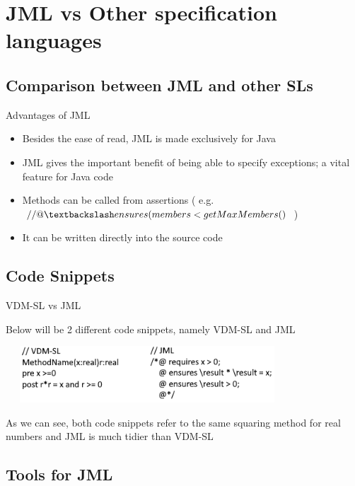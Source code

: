 \documentclass{beamer}
\begin{document}
\section{JML vs Other specification languages}

\subsection{Comparison between JML and other SLs}

\begin{frame}{Advantages of JML}
    \begin{itemize}
        \item Besides the ease of read, JML is made exclusively for Java
        \item JML gives the important benefit of being able to specify exceptions; a vital feature for Java code
        \item Methods can be called from assertions ( e.g. $//@ \textbackslash ensures (members < getMaxMembers()$ ) 
        \item It can be written directly into the source code
        
    \end{itemize}
\end{frame}

\subsection{Code Snippets}

\begin{frame}{VDM-SL vs JML}

Below will be 2 different code snippets, namely VDM-SL and JML
\bigskip

    \includegraphics[height=60pt,width=300pt]{pic/code1.png}

As we can see, both code snippets refer to the same squaring method for real numbers and JML is much tidier than VDM-SL

\end{frame}

\subsection{Tools for JML}
\end{document}
